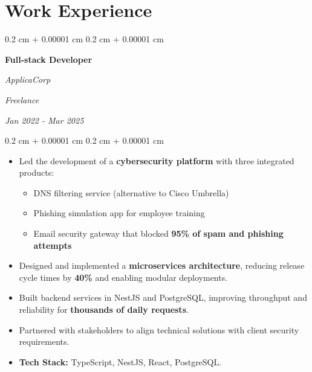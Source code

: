 \documentclass[10pt, letterpaper]{article}
\newenvironment{highlights}{
    \begin{itemize}[
        topsep=0.10 cm,
        parsep=0.10 cm,
        partopsep=0pt,
        itemsep=0pt,
        leftmargin=0.4 cm + 10pt
    ]
}{
    \end{itemize}
} %
\newenvironment{onecolentry}{
    \begin{adjustwidth}{
        0.2 cm + 0.00001 cm
    }{
        0.2 cm + 0.00001 cm
    }
}{
    \end{adjustwidth}
} %
\newenvironment{twocolentry}[2][]{
    \onecolentry
    \def\secondColumn{#2}
    \setcolumnwidth{\fill, 4.5 cm}
    \begin{paracol}{2}
}{
    \switchcolumn \raggedleft \secondColumn
    \end{paracol}
    \endonecolentry
} %
\begin{document}
        \vspace{0.2 cm}


    
    \section{Work Experience}

        \begin{twocolentry}{
        \textit{Freelance}

        \textit{Jan 2022 - Mar 2025}}
            \textbf{Full-stack Developer }
            
            \textit{ApplicaCorp}
        \end{twocolentry}


        \vspace{0.10 cm}
        \begin{onecolentry}
            \begin{highlights}
                \item Led the development of a \textbf{cybersecurity platform} with three integrated products:
                \begin{itemize}
                    \item DNS filtering service (alternative to Cisco Umbrella)
                    \item Phishing simulation app for employee training
                    \item Email security gateway that blocked \textbf{95\% of spam and phishing attempts}
                \end{itemize}
                \item Designed and implemented a \textbf{microservices architecture}, reducing release cycle times by \textbf{40\%} and enabling modular deployments.
                \item Built backend services in NestJS and PostgreSQL, improving throughput and reliability for \textbf{thousands of daily requests}.
                \item Partnered with stakeholders to align technical solutions with client security requirements.
                \item \textbf{Tech Stack:} TypeScript, NestJS, React, PostgreSQL.
            \end{highlights}
        \end{onecolentry}


        \vspace{0.2 cm}
\end{document}
